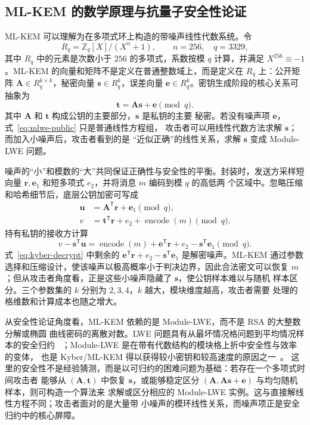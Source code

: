 \documentclass[a4paper,fontset=none]{ctexart}
\begin{document}
\subsection{ML-KEM 的数学原理与抗量子安全性论证}
\label{sec:mlkem-math}

ML-KEM 可以理解为在多项式环上构造的带噪声线性代数系统。令
\begin{equation}
  R_q=\mathbb{Z}_q[X]/(X^n+1),\qquad n=256,\quad q=3329 ,
  \label{eq:ring}
\end{equation}
其中 $R_q$ 中的元素是次数小于 $256$ 的多项式，系数按模 $q$ 计算，并满足
$X^{256}\equiv -1$。ML-KEM 的向量和矩阵不是定义在普通整数域上，而是定义在
$R_q$ 上：公开矩阵 $\bm{A}\in R_q^{k\times k}$，秘密向量
$\bm{s}\in R_q^k$，误差向量 $\bm{e}\in R_q^k$。密钥生成阶段的核心关系可
抽象为
\begin{equation}
  \bm{t}=\bm{A}\bm{s}+\bm{e}\pmod q .
  \label{eq:mlwe-public}
\end{equation}
其中 $\bm{A}$ 和 $\bm{t}$ 构成公钥的主要部分，$\bm{s}$ 是私钥的主要
秘密。若没有噪声项 $\bm{e}$，式~\eqref{eq:mlwe-public} 只是普通线性方程组，
攻击者可以用线性代数方法求解 $\bm{s}$；而加入小噪声后，攻击者看到的是
``近似正确''的线性关系，求解 $\bm{s}$ 变成 Module-LWE 问题。

噪声的``小''和模数的``大''共同保证正确性与安全性的平衡。封装时，发送方采样短向量
$\bm{r},\bm{e}_1$ 和短多项式 $e_2$，并将消息 $m$ 编码到模 $q$ 的高低两
个区域中。忽略压缩和哈希细节后，底层公钥加密可写成
\begin{align}
  \bm{u} &= \bm{A}^{\mathsf{T}}\bm{r}+\bm{e}_1 \pmod q, \label{eq:kyber-u}\\
  v &= \bm{t}^{\mathsf{T}}\bm{r}+e_2+\operatorname{encode}(m) \pmod q . \label{eq:kyber-v}
\end{align}
持有私钥的接收方计算
\begin{equation}
  v-\bm{s}^{\mathsf{T}}\bm{u}
  = \operatorname{encode}(m)
    + \bm{e}^{\mathsf{T}}\bm{r}+e_2-\bm{s}^{\mathsf{T}}\bm{e}_1
    \pmod q .
  \label{eq:kyber-decrypt}
\end{equation}
式~\eqref{eq:kyber-decrypt} 中剩余的
$\bm{e}^{\mathsf{T}}\bm{r}+e_2-\bm{s}^{\mathsf{T}}\bm{e}_1$ 是解密噪声。ML-KEM
通过参数选择和压缩设计，使该噪声以极高概率小于判决边界，因此合法密文可以恢复
$m$；但从攻击者角度看，正是这些小噪声隐藏了 $\bm{s}$，使公钥样本难以与随机
样本区分。三个参数集的 $k$ 分别为 $2,3,4$，$k$ 越大，模块维度越高，攻击者需要
处理的格维数和计算成本也随之增大。

从安全性论证角度看，ML-KEM 依赖的是 Module-LWE，而不是 RSA 的大整数分解或椭圆
曲线密码的离散对数。LWE 问题具有从最坏情况格问题到平均情况样本的安全归约
~\cite{Regev2005}；Module-LWE 是在带有代数结构的模块格上折中安全性与效率的变体，
也是 Kyber/ML-KEM 得以获得较小密钥和较高速度的原因之一~\cite{Bos2018,Kyber2021}。
这里的安全性不是经验猜测，而是以可归约的困难问题为基础：若存在一个多项式时间攻击者
能够从 $(\bm{A},\bm{t})$ 中恢复 $\bm{s}$，或能够稳定区分
$(\bm{A},\bm{A}\bm{s}+\bm{e})$ 与均匀随机样本，则可构造一个算法来
求解或区分相应的 Module-LWE 实例。这与直接解线性方程不同；攻击者面对的是大量带
小噪声的模环线性关系，而噪声项正是安全归约中的核心屏障。
\end{document}
